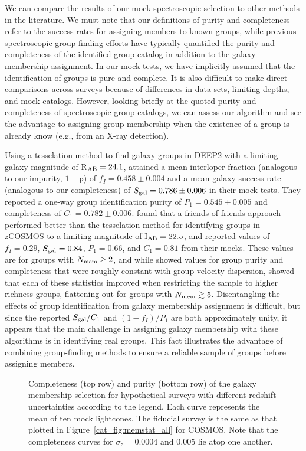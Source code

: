 We can compare the results of our mock spectroscopic selection to
other methods in the literature. We must note that our definitions of purity and
completeness refer to the success rates for assigning members to known
groups, while previous spectroscopic group-finding efforts have typically
quantified the purity and completeness of the identified group catalog in
addition to the galaxy membership assignment. In our mock tests, we
have implicitly assumed that the identification of groups is pure and
complete. It is also difficult to make direct comparisons across surveys
because of differences in data sets, limiting depths, and mock
catalogs. However, looking briefly at the quoted purity and
completeness of spectroscopic group catalogs, we can assess our
algorithm and see the advantage to assigning group membership when the
existence of a group is already know (e.g., from an X-ray detection).

Using a tesselation method to find galaxy groups in DEEP2 with a
limiting galaxy magnitude of R$_{\rm AB}=24.1$,
\citet{Gerke2005} attained a mean interloper fraction (analogous to
our impurity, $1-\mathsf{p}$) of $f_I=0.458\pm0.004$ and a mean galaxy
success rate (analogous to our completeness) of $S_{\rm
  gal}=0.786\pm0.006$ in their mock tests. They reported a one-way group identification
purity of $P_1=0.545\pm0.005$ and completeness of
$C_1=0.782\pm0.006$. \citet{Knobel2009} found that a
friends-of-friends approach performed better than the tesselation
method for identifying groups in zCOSMOS to a limiting magnitude of
I$_{\rm AB}=22.5$, and reported values of
$f_I=0.29$, $S_{\rm gal}=0.84$, $P_1=0.66$, and $C_1=0.81$ from their mocks. These
values are for groups with $N_{\rm mem}\ge2$, and while
\citet{Gerke2005} showed values for group purity and completeness that
were roughly constant with group velocity dispersion,
\citet{Knobel2009} showed that each of these statistics improved when
restricting the sample to higher richness groups, flattening out for
groups with $N_{\rm mem}\gtrsim5$. Disentangling the effects of group
identification from galaxy membership assignment is difficult, but
since the reported $S_{\rm gal}/C_1$ and $(1-f_I)/P_1$ are both
approximately unity, it appears that the main challenge in assigning
galaxy membership with these algorithms is in identifying real
groups. This fact illustrates the advantage of combining group-finding
methods to ensure a reliable sample of groups before assigning members.


\begin{figure}
\caption{Completeness (top row) and purity (bottom row) of the galaxy
  membership selection for hypothetical surveys with different
  redshift uncertainties according to the legend. Each curve
  represents the mean of ten mock lightcones. The fiducial survey is the same as
  that plotted in Figure~\ref{cat_fig:memstat_all} for COSMOS. Note that
  the completeness curves for $\sigma_z=0.0004$ and $0.005$ lie atop
  one another.}
\label{cat_fig:memstat_surveys_zerr}
\end{figure}

